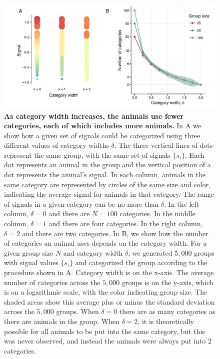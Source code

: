 \begin{figure}[ht]
\includegraphics[width=6.85in]{figures/category_diagram.pdf}
\caption{\sffamily\small\textbf{As category width increases, the animals use fewer categories, each of which includes more animals.} 
In A we show how a given set of signals could be categorized using three different values of category widths $\delta$. The three vertical lines of dots represent the same group, with the same set of signals $\{s_i\}$. Each dot represents an animal in the group and the vertical position of a dot represents the animal's signal. In each column, animals in the same category are represented by circles of the same size and color, indicating the average signal for animals in that category. The range of signals in a given category can be no more than $\delta$. In the left column, $\delta=0$ and there are $N=100$ categories. In the middle column, $\delta=1$ and there are four categories. In the right column, $\delta=2$ and there are two categories.  In B, we show how the number of categories an animal uses depends on the category width. For a given group size $N$ and category width $\delta$, we generated $5,000$ groups with signal values $\{s_i\}$ and categorized the group according to the procedure shown in A.  Category width is on the x-axis. The average number of categories across the $5,000$ groups is on the y-axis, which is on a logarithmic scale, with the color indicating group size. The shaded areas show this average plus or minus the standard deviation across the $5,000$ groups. When $\delta=0$ there are as many categories as there are animals in the group. When $\delta=2$, it is theoretically possible for all animals to be put into the same category, but this was never observed, and instead the animals were always put into $2$ categories. }
 \label{category_diagram}
\end{figure}

